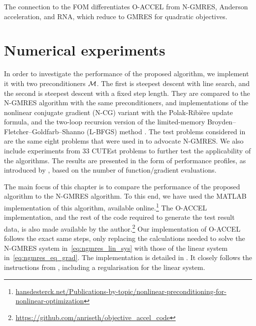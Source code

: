 \documentclass[main.tex]{subfiles}
\begin{document}
\begin{remark}
  The connection to the FOM differentiates O-ACCEL from N-GMRES,
  Anderson acceleration, and RNA, which reduce to GMRES for quadratic
  objectives.
\end{remark}


\section{Numerical experiments}\label{sec:num_experiments}
In order to investigate the performance of the proposed algorithm, we
implement it with two preconditioners $\mathcal{M}$. The first is steepest
descent with line search, and the second is steepest descent with a
fixed step length.  They are compared to the N-GMRES algorithm with
the same preconditioners, and implementations of the nonlinear
conjugate gradient (N-CG) variant with the Polak-Ribi\`{e}re update
formula, and the two-loop recursion version of the limited-memory
Broyden--Fletcher--Goldfarb--Shanno (L-BFGS) method
\citep{nocedal2006numerical}.  The test problems considered in
are the same eight problems that were used
in \citet{sterck2013steepest} to advocate N-GMRES. We also include
experiments from \num{33} CUTEst problems to further test the
applicability of the algorithms.  The results are presented in the
form of performance profiles, as introduced by
\citet{dolan2002benchmarking}, based on the number of
function/gradient evaluations.

The main focus of this chapter is to compare the performance of the
proposed algorithm to the N-GMRES algorithm. To this end, we have used
the MATLAB implementation of this algorithm, available
online.\footnote{\href{http://www.hansdesterck.net/Publications-by-topic/nonlinear-preconditioning-for-nonlinear-optimization}
  {hansdesterck.net/Publications-by-topic/nonlinear-preconditioning-for-nonlinear-optimization}}
The O-ACCEL implementation, and the rest of the code required to
generate the test result data, is also made available by the
author.\footnote{\url{https://github.com/anriseth/objective_accel_code}}
Our implementation of O-ACCEL follows the exact same steps, only
replacing the calculations needed to solve the N-GMRES system
in~\eqref{eq:ngmres_lin_sys} with those of the linear system
in~\eqref{eq:ngmres_eq_grad}.  The implementation is detailed in
. It closely follows the instructions from
\citet{washio1997krylov}, including a regularisation for the linear
system.
\end{document}

